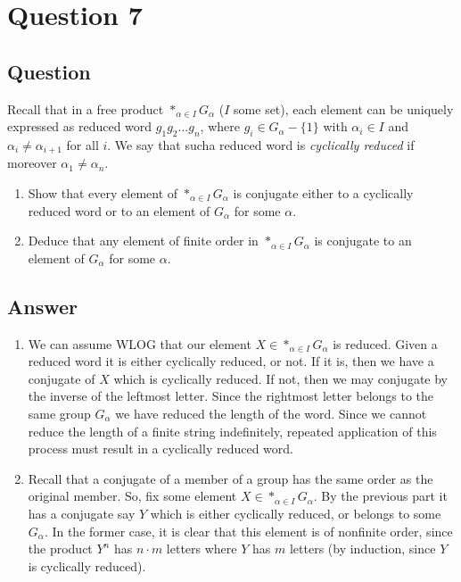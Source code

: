 \documentclass[11pt]{article}
\begin{document}
\section{Question 7}
\subsection{Question}
Recall that in a free product $*_{\alpha\in I}G_\alpha$ ($I$ some set), each element can be uniquely expressed as reduced word $g_1g_2\dots g_n$, where $g_i \in G_\alpha-\{1\}$ with $\alpha_i \in I$ and $\alpha_i \neq \alpha_{i+1}$ for all $i$. We say that sucha  reduced word is \emph{cyclically reduced} if moreover $\alpha_1\neq \alpha_n$.
\begin{enumerate}
\item Show that every element of $*_{\alpha \in I}G_\alpha$ is conjugate either to a cyclically reduced word or to an element of $G_\alpha$ for some $\alpha$.
\item Deduce that any element of finite order in $*_{\alpha \in I}G_\alpha$ is conjugate to an element of $G_\alpha$ for some $\alpha$.
\end{enumerate}
\subsection{Answer}
\begin{enumerate}
\item We can assume WLOG that our element $X \in *_{\alpha \in I}G_\alpha$ is reduced. Given a reduced word it is either cyclically reduced, or not. If it is, then we have a conjugate of $X$ which is cyclically reduced. If not, then we may conjugate by the inverse of the leftmost letter. Since the rightmost letter belongs to the same group $G_\alpha$ we have reduced the length of the word. Since we cannot reduce the length of a finite string indefinitely, repeated application of this process must result in a cyclically reduced word.
\item Recall that a conjugate of a member of a group has the same order as the original member. So, fix some element $X \in *_{\alpha \in I}G_\alpha$. By the previous part it has a conjugate say $Y$ which is either cyclically reduced, or belongs to some $G_\alpha$. In the former case, it is clear that this element is of nonfinite order, since the product $Y^n$ has $n\cdot m$ letters where $Y$ has $m$ letters (by induction, since $Y$ is cyclically reduced). 
\end{enumerate}
\end{document}
